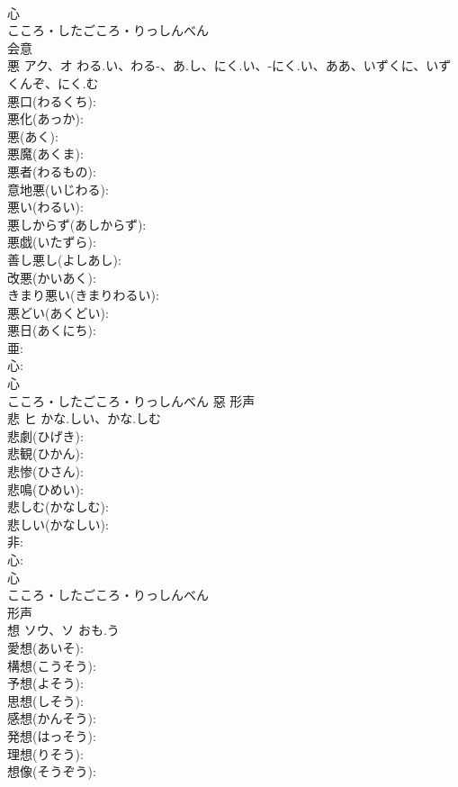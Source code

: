 \documentclass[8pt]{extreport}
\begin{document}
\begin{CJK}{UTF8}{min}
\\	心	
\\	こころ・したごころ・りっしんべん	
\\	会意 
\\	悪	アク、オ	わる.い、わる-、あ.し、にく.い、-にく.い、ああ、いずくに、いずくんぞ、にく.む		
\\	悪口(わるくち): 
\\	悪化(あっか): 
\\	悪(あく): 
\\	悪魔(あくま): 
\\	悪者(わるもの): 
\\	意地悪(いじわる): 
\\	悪い(わるい): 
\\	悪しからず(あしからず): 
\\	悪戯(いたずら): 
\\	善し悪し(よしあし): 
\\	改悪(かいあく): 
\\	きまり悪い(きまりわるい): 
\\	悪どい(あくどい): 
\\	悪日(あくにち): 
\\	亜: 
\\	心: 
\\	心	
\\	こころ・したごころ・りっしんべん	惡	形声 
\\	悲	ヒ	かな.しい、かな.しむ		
\\	悲劇(ひげき): 
\\	悲観(ひかん): 
\\	悲惨(ひさん): 
\\	悲鳴(ひめい): 
\\	悲しむ(かなしむ): 
\\	悲しい(かなしい): 
\\	非: 
\\	心: 
\\	心	
\\	こころ・したごころ・りっしんべん	
\\	形声 
\\	想	ソウ、ソ	おも.う		
\\	愛想(あいそ): 
\\	構想(こうそう): 
\\	予想(よそう): 
\\	思想(しそう): 
\\	感想(かんそう): 
\\	発想(はっそう): 
\\	理想(りそう): 
\\	想像(そうぞう): 

\end{CJK}
\end{document}
